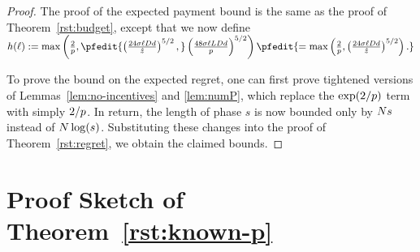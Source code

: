 \begin{proof}
The proof of the expected payment bound is the same as the proof of Theorem~\ref{rst:budget}, except that we now define $h(\ell) := \max \left( \frac{2}{\MinProb},
\pfedit{
\left( \frac{24 \sigma \ell \Diam d}{\TieCutoff} \right)^{5/2},
}
\left( \frac{48 \sigma \ell \TieDensity \Diam d}{\MinProb} \right)^{5/2}
\right)
\pfedit{
= 
\max \left( \frac{2}{\MinProb},
\left( \frac{24 \sigma \ell \Diam d}{\TieCutoff} \right)^{5/2}
\right).
}
$

To prove the bound on the expected regret, one can first prove tightened versions of Lemmas~\ref{lem:no-incentives} and \ref{lem:numP},
which replace the $\exp(2/p)$ term with simply $2/p$.
In return, the length of phase $s$ is now bounded only by $N s$ instead of $N \log(s)$.
Substituting these changes into the proof of Theorem~\ref{rst:regret}, we obtain the claimed bounds.




\end{proof}

\section{Proof Sketch of Theorem~\ref{rst:known-p}}
\label{sec:discussion-proof2}


